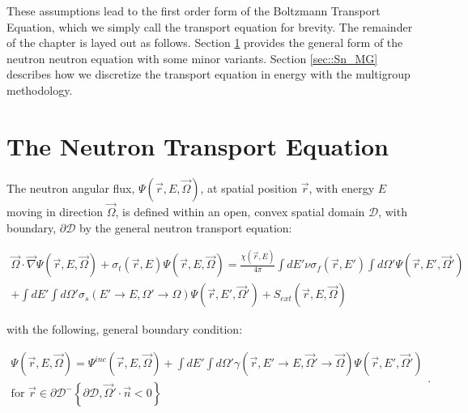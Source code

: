 These assumptions lead to the first order form of the Boltzmann Transport Equation, which we simply call the transport equation for brevity. The remainder of the chapter is layed out as follows. Section \ref{sec::Sn_neut} provides the general form of the neutron neutron equation with some minor variants. Section \ref{sec::Sn_MG} describes how we discretize the transport equation in energy with the multigroup methodology. 

\section{The Neutron Transport Equation}
\label{sec::Sn_neut}

The neutron angular flux, $\Psi (\vec{r}, E, \vec{\Omega})$, at spatial position $\vec{r}$, with energy $E$ moving in direction $\vec{\Omega}$, is defined within an open, convex spatial domain $\mathcal{D}$, with boundary, $\partial \mathcal{D}$ by the general neutron transport equation:


\begin{equation}
\label{eq::Sn_transport_eq_full_source}
\begin{aligned}
	\vec{\Omega} \cdot \vec{\nabla} \Psi (\vec{r}, E, \vec{\Omega})+ \sigma_t (\vec{r}, E) \Psi (\vec{r}, E, \vec{\Omega}) = \frac{\chi (\vec{r}, E)}{4 \pi} \int dE' \nu \sigma_f (\vec{r}, E') \int d\Omega' \Psi (\vec{r}, E', \vec{\Omega}') \\ 
	+ \int dE' \int d\Omega' \sigma_s (E' \rightarrow E, \Omega' \rightarrow \Omega) \Psi (\vec{r}, E', \vec{\Omega}') + S_{ext} (\vec{r}, E, \vec{\Omega})
\end{aligned}
\end{equation}

\noindent with the following, general boundary condition:

\begin{equation}
\label{eq::Sn_transport_bc_full}
\begin{aligned}
	\Psi (\vec{r}, E, \vec{\Omega}) = \Psi^{inc} (\vec{r}, E, \vec{\Omega}) + \int dE' \int d\Omega' \gamma (\vec{r}, E' \rightarrow E, \vec{\Omega}' \rightarrow \vec{\Omega}) \Psi (\vec{r}, E', \vec{\Omega}') \\
	\text{for } \vec{r} \in \partial \mathcal{D}^{-} \left\{   \partial \mathcal{D}, \vec{\Omega}' \cdot \vec{n} < 0  \right\}
\end{aligned} .
\end{equation}

